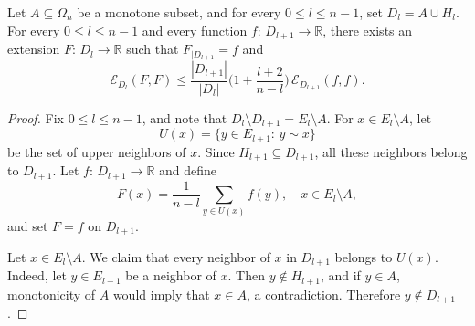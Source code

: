 \documentclass[10pt,a4paper]{amsart}
\newcommand{\Ecal}{\mathcal{E}}
\newcommand{\R}{\mathbb{R}}
\begin{document}
\begin{lemma}\label{lem:one-step-extension}
    Let $A\subseteq \Omega_n$ be a monotone subset, and for every $0\leq l\leq n-1$, set $D_l=A\cup H_l$. For every $0\leq l\leq n-1$ and every function $f:\, D_{l+1}\to \R$, there exists an extension $F:\, D_{l}\to \R$ such that $F_{\mid D_{l+1}}=f$ and 
    $$
    \Ecal_{D_l}(F,F)\leq \frac{|D_{l+1}|}{|D_l|} \Big(1+\frac{l+2}{n-l}\Big)\, \Ecal_{D_{l+1}}(f,f). 
    $$
\end{lemma}

\begin{proof}
 Fix $0\leq l\leq n-1$, and note that $D_l\setminus D_{l+1}=E_l\setminus A$. For $x\in E_l\setminus A$, let 
 $$
 U(x)=\{y\in E_{l+1}:\, y\sim x\}
 $$
 be the set of upper neighbors of $x$. Since $H_{l+1}\subseteq D_{l+1}$, all these neighbors belong to $D_{l+1}$. 
 Let $f:\, D_{l+1}\to \R$ and define 
 $$
 F(x)=\frac{1}{n-l}\sum_{y\in U(x)} f(y),\quad x\in E_l\setminus A,
 $$
 and set $F=f$ on $D_{l+1}$. 

Let $x\in E_l\setminus A$. We claim that every neighbor of $x$ in $D_{l+1}$ belongs to $U(x)$. Indeed, let $y\in E_{l-1}$ be a neighbor of $x$. Then $y\not\in H_{l+1}$, and if $y\in A$, monotonicity of $A$ would imply that $x\in A$, a contradiction. Therefore $y\not\in D_{l+1}$. 


\end{proof}
\end{document}
